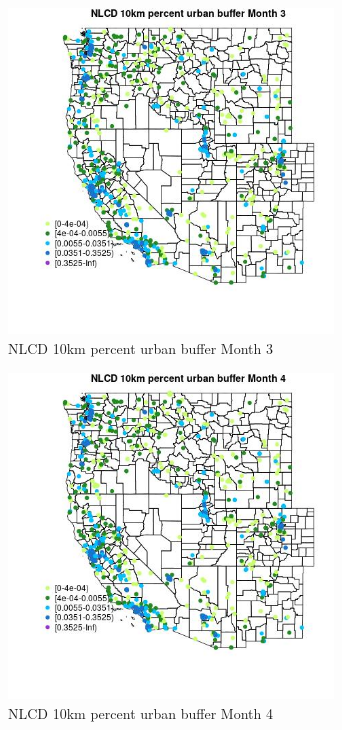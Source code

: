 \begin{figure} 
\centering  
\includegraphics[width=0.77\textwidth]{Code_Outputs/Report_ML_input_PM25_Step4_part_e_de_duplicated_aves_compiled_2019-05-21wNAs_MapObsMo3NLCD_10km_percent_urban_buffer.jpg} 
\caption{\label{fig:Report_ML_input_PM25_Step4_part_e_de_duplicated_aves_compiled_2019-05-21wNAsMapObsMo3NLCD_10km_percent_urban_buffer}NLCD 10km percent urban buffer Month 3} 
\end{figure} 
 

\begin{figure} 
\centering  
\includegraphics[width=0.77\textwidth]{Code_Outputs/Report_ML_input_PM25_Step4_part_e_de_duplicated_aves_compiled_2019-05-21wNAs_MapObsMo4NLCD_10km_percent_urban_buffer.jpg} 
\caption{\label{fig:Report_ML_input_PM25_Step4_part_e_de_duplicated_aves_compiled_2019-05-21wNAsMapObsMo4NLCD_10km_percent_urban_buffer}NLCD 10km percent urban buffer Month 4} 
\end{figure} 
 

